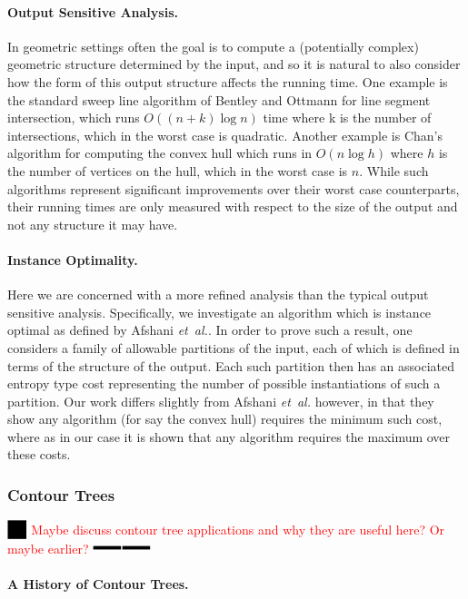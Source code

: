 \documentclass[11pt]{article}
\theoremstyle{definition}
\newcommand{\etal}{\textit{et~al.}\xspace}
\newcommand{\XSays}[2]{{
      {$\rule[-0.12cm]{0.2in}{0.5cm}$\fbox{\tt
            #1:} }
      \textcolor{red}{#2}
      \marginpar{\textcolor{blue}{#1}}
      {$\rule[0.1cm]{0.3in}{0.1cm}$\fbox{\tt
            end}$\rule[0.1cm]{0.3in}{0.1cm}$}
      }
   }
\newcommand{\Ben}[1]{{\XSays{Ben}{#1}}}
\begin{document}
\paragraph{Output Sensitive Analysis.}
In geometric settings often the goal is to compute a (potentially complex) geometric structure determined 
by the input, and so it is natural to also consider how the form of this output structure affects the running time.
One example is the standard sweep line algorithm of Bentley and Ottmann \cite{bo-arcgi-79} for line segment intersection, 
which runs $O((n+k)\log n)$ time where k is the number of intersections, which in the worst case is quadratic.
Another example is Chan's algorithm for computing the convex hull \cite{c-ooscha-96} which runs in $O(n\log h)$ 
where $h$ is the number of vertices on the hull, which in the worst case is $n$.  While such algorithms represent 
significant improvements over their worst case counterparts, their running times are only measured with respect 
to the size of the output and not any structure it may have.

\paragraph{Instance Optimality.}  
Here we are concerned with a more refined analysis than the typical output sensitive analysis.
Specifically, we investigate an algorithm which is instance optimal as defined by Afshani \etal \cite{abc-ioga-09}.  
In order to prove such a result, one considers a family of allowable partitions of the input, 
each of which is defined in terms of the structure of the output.  Each such partition then has 
an associated entropy type cost representing the number of possible instantiations of such a partition.
Our work differs slightly from Afshani \etal \cite{abc-ioga-09} however, in that they show any algorithm 
(for say the convex hull) requires the minimum such cost, where as in our case it is shown that 
any algorithm requires the maximum over these costs.


\subsubsection{Contour Trees}

\Ben{Maybe discuss contour tree applications and why they are useful here? Or maybe earlier?}

\paragraph{A History of Contour Trees.}
\end{document}
